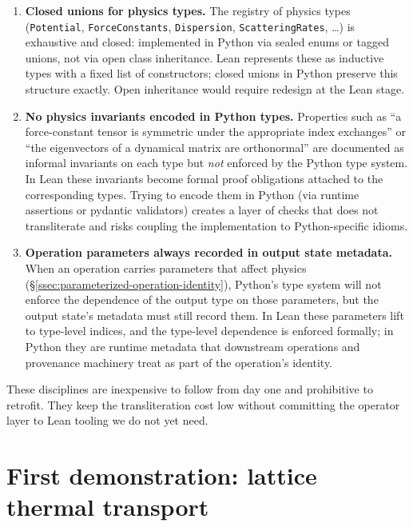 \documentclass[11pt,a4paper]{article}
\begin{document}
\begin{enumerate}[leftmargin=2em]
  \item \textbf{Closed unions for physics types.} The registry of physics types
        (\texttt{Potential}, \texttt{ForceConstants}, \texttt{Dispersion},
        \texttt{ScatteringRates}, \ldots) is exhaustive and closed: implemented in Python via
        sealed enums or tagged unions, not via open class inheritance. Lean represents these as
        inductive types with a fixed list of constructors; closed unions in Python preserve this
        structure exactly. Open inheritance would require redesign at the Lean stage.
  \item \textbf{No physics invariants encoded in Python types.} Properties such as ``a
        force-constant tensor is symmetric under the appropriate index exchanges'' or ``the
        eigenvectors of a dynamical matrix are orthonormal'' are documented as informal
        invariants on each type but \emph{not} enforced by the Python type system. In Lean these
        invariants become formal proof obligations attached to the corresponding types. Trying
        to encode them in Python (via runtime assertions or pydantic validators) creates a layer
        of checks that does not transliterate and risks coupling the implementation to
        Python-specific idioms.
  \item \textbf{Operation parameters always recorded in output state metadata.} When an operation
        carries parameters that affect physics (\S\ref{ssec:parameterized-operation-identity}),
        Python's type system will not enforce the dependence of the output type on those
        parameters, but the output state's metadata must still record them. In Lean these
        parameters lift to type-level indices, and the type-level dependence is enforced
        formally; in Python they are runtime metadata that downstream operations and provenance
        machinery treat as part of the operation's identity.
\end{enumerate}

These disciplines are inexpensive to follow from day one and prohibitive to retrofit. They keep
the transliteration cost low without committing the operator layer to Lean tooling we do not yet
need.


\section{First demonstration: lattice thermal transport}
\label{sec:demo}
\end{document}
